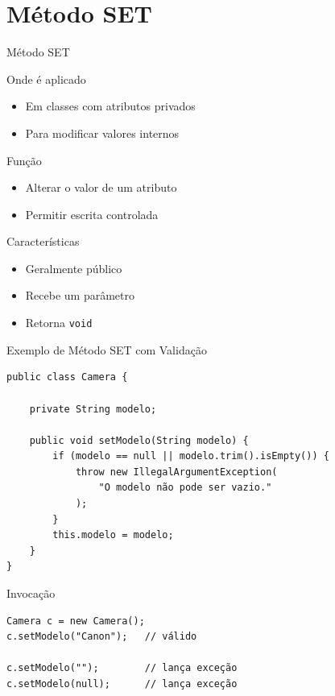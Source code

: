 \documentclass[9pt]{beamer}
\begin{document}
\section{Método SET}
\begin{frame}{Método SET}

\begin{block}{Onde é aplicado}
\begin{itemize}
    \item Em classes com atributos privados
    \item Para modificar valores internos
\end{itemize}
\end{block}

\begin{block}{Função}
\begin{itemize}
    \item Alterar o valor de um atributo
    \item Permitir escrita controlada
\end{itemize}
\end{block}

\begin{block}{Características}
\begin{itemize}
    \item Geralmente público
    \item Recebe um parâmetro
    \item Retorna \texttt{void}
\end{itemize}
\end{block}

\end{frame}
\begin{frame}[fragile]{Exemplo de Método SET com Validação}

\begin{verbatim}
public class Camera {

    private String modelo;

    public void setModelo(String modelo) {
        if (modelo == null || modelo.trim().isEmpty()) {
            throw new IllegalArgumentException(
                "O modelo não pode ser vazio."
            );
        }
        this.modelo = modelo;
    }
}
\end{verbatim}

\begin{block}{Invocação}
\begin{verbatim}
Camera c = new Camera();
c.setModelo("Canon");   // válido

c.setModelo("");        // lança exceção
c.setModelo(null);      // lança exceção
\end{verbatim}
\end{block}

\end{frame}
\end{document}

